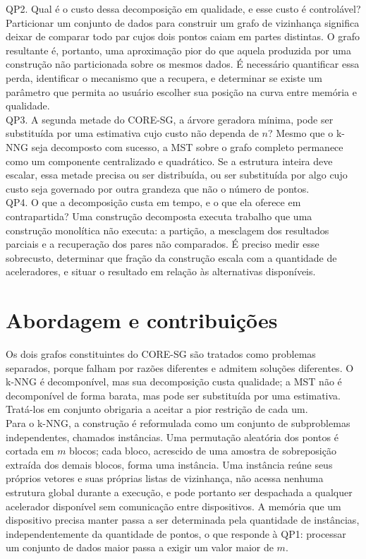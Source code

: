 QP2. Qual é o custo dessa decomposição em qualidade, e esse custo é controlável? Particionar um conjunto de dados para construir um grafo de vizinhança significa deixar de comparar todo par cujos dois pontos caiam em partes distintas. O grafo resultante é, portanto, uma aproximação pior do que aquela produzida por uma construção não particionada sobre os mesmos dados. É necessário quantificar essa perda, identificar o mecanismo que a recupera, e determinar se existe um parâmetro que permita ao usuário escolher sua posição na curva entre memória e qualidade.\\

QP3. A segunda metade do \ac{CORE-SG}, a árvore geradora mínima, pode ser substituída por uma estimativa cujo custo não dependa de $n$? Mesmo que o \ac{k-NNG} seja decomposto com sucesso, a \ac{MST} sobre o grafo completo permanece como um componente centralizado e quadrático. Se a estrutura inteira deve escalar, essa metade precisa ou ser distribuída, ou ser substituída por algo cujo custo seja governado por outra grandeza que não o número de pontos.\\

QP4. O que a decomposição custa em tempo, e o que ela oferece em contrapartida? Uma construção decomposta executa trabalho que uma construção monolítica não executa: a partição, a mesclagem dos resultados parciais e a recuperação dos pares não comparados. É preciso medir esse sobrecusto, determinar que fração da construção escala com a quantidade de aceleradores, e situar o resultado em relação às alternativas disponíveis.\\

\section{Abordagem e contribuições\label{sec:contributions}}

Os dois grafos constituintes do \ac{CORE-SG} são tratados como problemas separados, porque falham por razões diferentes e admitem soluções diferentes. O \ac{k-NNG} é decomponível, mas sua decomposição custa qualidade; a \ac{MST} não é decomponível de forma barata, mas pode ser substituída por uma estimativa. Tratá-los em conjunto obrigaria a aceitar a pior restrição de cada um.\\

Para o \ac{k-NNG}, a construção é reformulada como um conjunto de subproblemas independentes, chamados instâncias. Uma permutação aleatória dos pontos é cortada em $m$ blocos; cada bloco, acrescido de uma amostra de sobreposição extraída dos demais blocos, forma uma instância. Uma instância reúne seus próprios vetores e suas próprias listas de vizinhança, não acessa nenhuma estrutura global durante a execução, e pode portanto ser despachada a qualquer acelerador disponível sem comunicação entre dispositivos. A memória que um dispositivo precisa manter passa a ser determinada pela quantidade de instâncias, independentemente da quantidade de pontos, o que responde à QP1: processar um conjunto de dados maior passa a exigir um valor maior de $m$.\\

